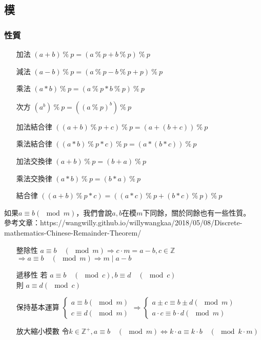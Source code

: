 \subsection{模}
\subsubsection{性質}
\begin{enumerate}
\item [加法] $(a+b)\ \%\ p= (a\ \%\ p +b\ \%\ p )\ \%\ p$
\item [減法] $(a-b)\ \%\ p= (a\ \%\ p -b\ \%\ p +p)\ \%\ p$
\item [乘法] $(a*b)\ \%\ p= (a\ \%\ p *b\ \%\ p )\ \%\ p$
\item [次方] $(a^b)\ \%\ p= ((a\ \%\ p )^b)\ \%\ p$
\item [加法結合律] $((a+b)\ \%\ p+c)\ \%\ p = (a+(b+c))\ \%\ p$
\item [乘法結合律] $((a*b)\ \%\ p*c)\ \%\ p = (a*(b*c))\ \%\ p$
\item [加法交換律] $(a+b)\ \%\ p=(b+a)\ \%\ p$
\item [乘法交換律] $(a*b)\ \%\ p=(b*a)\ \%\ p$
\item [結合律] $((a+b)\ \%\ p*c)= ((a*c)\ \%\ p +(b*c)\ \%\ p )\ \%\ p$
\end{enumerate}
如果$a\equiv b (\mod m)$，我們會說$a,b$在模$m$下同餘，關於同餘也有一些性質。\\
參考文章：https://wangwilly.github.io/willywangkaa/2018/05/08/Discrete-mathematics-Chinese-Remainder-Theorem/
\begin{enumerate}
\item [整除性] $a\equiv b \quad (\mod m) \Rightarrow c \cdot m  = a - b , c \in \mathbb{Z}$\\ $\Rightarrow a \equiv b\quad ( \mod m ) \Rightarrow m \; | \; a-b$
\item [遞移性] 若 $a \equiv b \quad (\mod c) , b \equiv d \quad (\mod c)$\\ 則 $a \equiv d (\mod c)$
\item [保持基本運算] $\left \{ \begin{matrix} a \equiv b (\mod m)\\ c \equiv d (\mod m)\end{matrix}\right. \Rightarrow \left\{\begin{matrix}a \pm c \equiv b \pm d (\mod m)\\ a \cdot c \equiv b \cdot d (\mod m)\end{matrix}\right.$
\item [放大縮小模數] 令$k \in \mathbb{Z}^+ , a \equiv b \quad (\mod m) \Leftrightarrow k \cdot a \equiv k \cdot b \quad (\mod k \cdot m)$
\end{enumerate}

